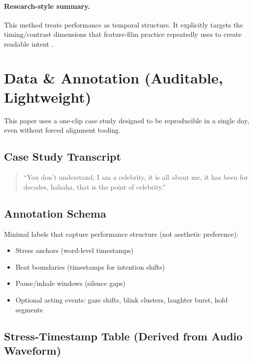 \documentclass[11pt,a4paper]{article}
\begin{document}
\paragraph{Research-style summary.} This method treats performance as temporal structure. It explicitly targets the timing/contrast dimensions that feature-film practice repeatedly uses to create readable intent \citep{thomas1995illusion, williams2009animator}.

\section{Data \& Annotation (Auditable, Lightweight)}

This paper uses a one-clip case study designed to be reproducible in a single day, even without forced alignment tooling.

\subsection{Case Study Transcript}

\begin{quote}
``You don't understand, I am a celebrity, it is all about me, it has been for decades, hahaha, that is the point of celebrity.''
\end{quote}

\subsection{Annotation Schema}

Minimal labels that capture performance structure (not aesthetic preference):

\begin{itemize}[leftmargin=2em]
    \item Stress anchors (word-level timestamps)
    \item Beat boundaries (timestamps for intention shifts)
    \item Pause/inhale windows (silence gaps)
    \item Optional acting events: gaze shifts, blink clusters, laughter burst, hold segments
\end{itemize}

\subsection{Stress-Timestamp Table (Derived from Audio Waveform)}
\end{document}
